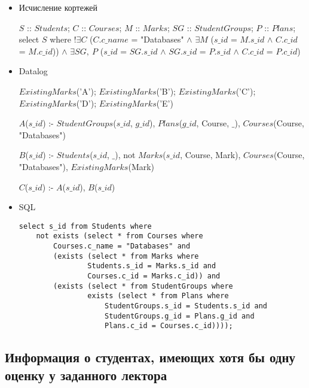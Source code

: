 \documentclass[12pt,a4paper,oneside]{article}
\begin{document}
\begin{itemize}

\item Исчисление кортежей

$S$ :: $Students$; $C$ :: $Courses$; $M$ :: $Marks$; $SG$ :: $StudentGroups$; $P$ :: $Plans$; select $S$ where $! \exists C$ ($C.c\_name$ = "Databases" $\wedge$ $\exists M$ ($s\_id$ = $M.s\_id$ $\wedge$ $C.c\_id$ = $M.c\_id$)) $\wedge$ $\exists SG,\ P$ ($s\_id$ = $SG.s\_id$ $\wedge$ $SG.s\_id$ = $P.s\_id$ $\wedge$ $C.c\_id$ = $P.c\_id$)

\item Datalog

$ExistingMarks$('A');
$ExistingMarks$('B');
$ExistingMarks$('C');
$ExistingMarks$('D');
$ExistingMarks$('E')

$A$($s\_id$) :- $StudentGroups$($s\_id$, $g\_id$), $Plans$($g\_id$, Course, $\_$), $Courses$(Course, "Databases")

$B$($s\_id$) :- $Students$($s\_id$, $\_$), not $Marks$($s\_id$, Course, Mark), $Courses$(Course, "Databases"), $ExistingMarks$(Mark)

$C$($s\_id$) :- $A$($s\_id$), $B$($s\_id$)

\item SQL

\begin{lstlisting}[label=task2b,caption={Задание 2(б)}]
select s_id from Students where
    not exists (select * from Courses where
        Courses.c_name = "Databases" and
        (exists (select * from Marks where
                Students.s_id = Marks.s_id and
                Courses.c_id = Marks.c_id)) and
        (exists (select * from StudentGroups where
                exists (select * from Plans where
                    StudentGroups.s_id = Students.s_id and
                    StudentGroups.g_id = Plans.g_id and
                    Plans.c_id = Courses.c_id))));
\end{lstlisting}

\end{itemize}

\subsection{Информация о студентах, имеющих хотя бы одну оценку у заданного лектора}
\end{document}

